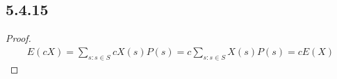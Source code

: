 \documentclass[twocolumn]{article}
\begin{document}
 	\subsection*{5.4.15}
 	\begin{proof}
 		\[
 		\begin{aligned}
 			E(cX)=\sum_{s:s\in S}cX(s)P(s)=c\sum_{s:s\in S}X(s)P(s)=cE(X)
 		\end{aligned}
 		\]
 	\end{proof}
\end{document}
